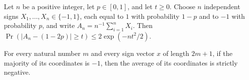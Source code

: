 \begin{theorem}
\label{FABL.measure_abs_biasedSignAverage_sub_mean_ge_le}
\leanok
{}
Let $n$ be a positive integer, let $p\in[0,1]$, and let $t\ge0$. Choose $n$ independent
signs $X_1,\ldots,X_n\in\{-1,1\}$, each equal to $1$ with probability $1-p$ and to $-1$
with probability $p$, and write $A_n=n^{-1}\sum_{i=1}^n X_i$. Then $\Pr(|A_n-(1-2p)|\ge
t)\le 2\exp(-nt^2/2)$.
\end{theorem}

\begin{theorem}
\label{FABL.biasedSignAverage_neg_of_majority_odd_eq_neg_one}
\leanok
{}
For every natural number $m$ and every sign vector $x$ of length $2m+1$, if the majority
of its coordinates is $-1$, then the average of its coordinates is strictly negative.
\end{theorem}

